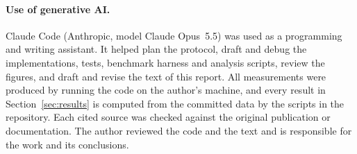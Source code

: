 \documentclass[11pt,a4paper]{article}
\begin{document}
\paragraph{Use of generative AI.} Claude Code (Anthropic, model Claude Opus~5.5)
was used as a programming and writing assistant. It helped plan the protocol,
draft and debug the implementations, tests, benchmark harness and analysis
scripts, review the figures, and draft and revise the text of this report. All
measurements were produced by running the code on the author's machine, and
every result in Section~\ref{sec:results} is computed from the committed data by
the scripts in the repository. Each cited source was checked against the original
publication or documentation. The author reviewed the code and the text and is
responsible for the work and its conclusions.
\end{document}
